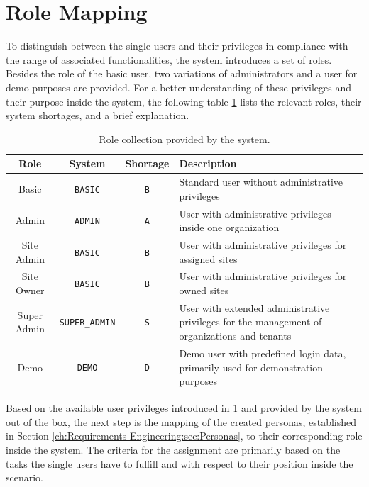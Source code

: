 \section{Role Mapping}
\label{ch:Requirements Engineering:sec:Role Mapping}

To distinguish between the single users and their privileges in compliance with the range of associated functionalities, the system introduces a set of roles. Besides the role of the basic user, two variations of administrators and a user for demo purposes are provided.
For a better understanding of these privileges and their purpose inside the system, the following table \ref{tab:system-role-collection} lists the relevant roles, their system shortages, and a brief explanation.

\begingroup
\setlength{\tabcolsep}{10pt} %
\renewcommand{\arraystretch}{1.5} %
\begin{table}[h]
    \centering
    \caption{Role collection provided by the system.}
    \begin{tabular}{c|c|c|m{6cm}}
        Role & System & Shortage & Description \\
        \hline
        Basic & \verb|BASIC| & \verb|B| & Standard user without administrative privileges \\
        Admin & \verb|ADMIN| & \verb|A| & User with administrative privileges inside one organization \\
        Site Admin & \verb|BASIC| & \verb|B| & User with administrative privileges for assigned sites \\
        Site Owner & \verb|BASIC| & \verb|B| & User with administrative privileges for owned sites \\
        Super Admin & \verb|SUPER_ADMIN| & \verb|S| & User with extended administrative privileges for the management of organizations and tenants \\
        Demo & \verb|DEMO| & \verb|D| & Demo user with predefined login data, primarily used for demonstration purposes \\
    \end{tabular}
    \label{tab:system-role-collection}
\end{table}
\endgroup

\noindent Based on the available user privileges introduced in \ref{tab:system-role-collection} and provided by the system out of the box, the next step is the mapping of the created personas, established in Section \ref{ch:Requirements Engineering:sec:Personas}, to their corresponding role inside the system.
The criteria for the assignment are primarily based on the tasks the single users have to fulfill and with respect to their position inside the scenario.

